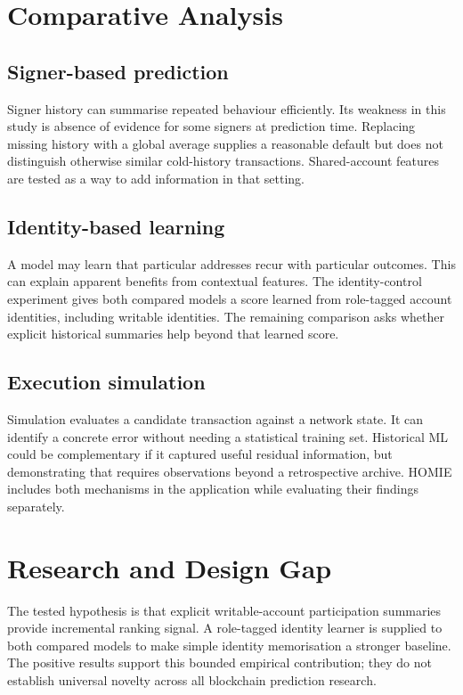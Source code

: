 \documentclass[12pt,a4paper,oneside]{report}
\begin{document}
\section{Comparative Analysis}
\subsection{Signer-based prediction}
Signer history can summarise repeated behaviour efficiently. Its weakness in this study is absence of evidence for some signers at prediction time. Replacing missing history with a global average supplies a reasonable default but does not distinguish otherwise similar cold-history transactions. Shared-account features are tested as a way to add information in that setting.
\subsection{Identity-based learning}
A model may learn that particular addresses recur with particular outcomes. This can explain apparent benefits from contextual features. The identity-control experiment gives both compared models a score learned from role-tagged account identities, including writable identities. The remaining comparison asks whether explicit historical summaries help beyond that learned score.
\subsection{Execution simulation}
Simulation evaluates a candidate transaction against a network state. It can identify a concrete error without needing a statistical training set. Historical ML could be complementary if it captured useful residual information, but demonstrating that requires observations beyond a retrospective archive. HOMIE includes both mechanisms in the application while evaluating their findings separately.

\section{Research and Design Gap}
The tested hypothesis is that explicit writable-account participation summaries provide incremental ranking signal. A role-tagged identity learner is supplied to both compared models to make simple identity memorisation a stronger baseline. The positive results support this bounded empirical contribution; they do not establish universal novelty across all blockchain prediction research.
\end{document}
